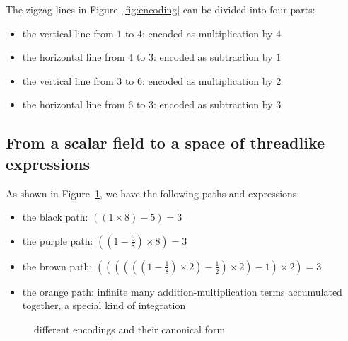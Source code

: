 The zigzag lines in Figure~\ref{fig:encoding} can be divided into four parts:
\begin{itemize}
\item the vertical line from $1$ to $4$: encoded as multiplication by $4$
\item the horizontal line from $4$ to $3$: encoded as subtraction by $1$
\item the vertical line from $3$ to $6$: encoded as multiplication by $2$
\item the horizontal line from $6$ to $3$: encoded as subtraction by $3$
\end{itemize}

\subsection{From a scalar field to a space of threadlike expressions}\label{subsec:from-field-to-space}

As shown in Figure~\ref{fig:canonicalform}, we have the following paths and expressions:
\begin{itemize}
\item the black path: $((1 \times 8) - 5) = 3$
\item the purple path: $((1 - \frac{5}{8}) \times 8) = 3$
\item the brown path: $((((((1 - \frac{1}{8}) \times 2) - \frac{1}{2}) \times 2) - 1) \times 2) = 3$
\item the orange path: infinite many addition-multiplication terms accumulated together, a special kind of integration
\end{itemize}

\begin{figure}[ht]
\centering
{}
\caption{different encodings and their canonical form}\label{fig:canonicalform}
\end{figure}

